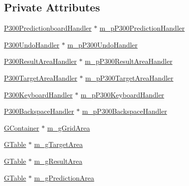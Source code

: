 \subsection*{Private Attributes}
\begin{DoxyCompactItemize}
\item 
\hyperlink{classOpenViBEApplications_1_1P300PredictionboardHandler}{P300PredictionboardHandler} $\ast$ \hyperlink{classOpenViBEApplications_1_1P300MainContainer_ab9a8b594f31398b35c2379f6f1e51ba5}{m\_\-pP300PredictionHandler}
\item 
\hyperlink{classOpenViBEApplications_1_1P300UndoHandler}{P300UndoHandler} $\ast$ \hyperlink{classOpenViBEApplications_1_1P300MainContainer_ad8c503ed9ccadfd6096c0a7c462eef6e}{m\_\-pP300UndoHandler}
\item 
\hyperlink{classOpenViBEApplications_1_1P300ResultAreaHandler}{P300ResultAreaHandler} $\ast$ \hyperlink{classOpenViBEApplications_1_1P300MainContainer_a3340088f9472c1a019149301adbc340c}{m\_\-pP300ResultAreaHandler}
\item 
\hyperlink{classOpenViBEApplications_1_1P300TargetAreaHandler}{P300TargetAreaHandler} $\ast$ \hyperlink{classOpenViBEApplications_1_1P300MainContainer_adecc9ca2fa692d9a5f4d741d08ce567c}{m\_\-pP300TargetAreaHandler}
\item 
\hyperlink{classOpenViBEApplications_1_1P300KeyboardHandler}{P300KeyboardHandler} $\ast$ \hyperlink{classOpenViBEApplications_1_1P300MainContainer_afc43c92129c3311fe266fb3cb02fcd95}{m\_\-pP300KeyboardHandler}
\item 
\hyperlink{classOpenViBEApplications_1_1P300BackspaceHandler}{P300BackspaceHandler} $\ast$ \hyperlink{classOpenViBEApplications_1_1P300MainContainer_ad699ec3cede735dddfa60103a6d80baa}{m\_\-pP300BackspaceHandler}
\item 
\hyperlink{classOpenViBEApplications_1_1GContainer}{GContainer} $\ast$ \hyperlink{classOpenViBEApplications_1_1P300MainContainer_ac639f7f61e0c4393b959378dc426e31f}{m\_\-gGridArea}
\item 
\hyperlink{classOpenViBEApplications_1_1GTable}{GTable} $\ast$ \hyperlink{classOpenViBEApplications_1_1P300MainContainer_aa573cdc09f41bdcb6f149b99fc8c1e0a}{m\_\-gTargetArea}
\item 
\hyperlink{classOpenViBEApplications_1_1GTable}{GTable} $\ast$ \hyperlink{classOpenViBEApplications_1_1P300MainContainer_a2aea9eec1dc46d9308b9c5000a061cda}{m\_\-gResultArea}
\item 
\hyperlink{classOpenViBEApplications_1_1GTable}{GTable} $\ast$ \hyperlink{classOpenViBEApplications_1_1P300MainContainer_a922413bfcce731559ce2532760143a5b}{m\_\-gPredictionArea}

\end{DoxyCompactItemize}
